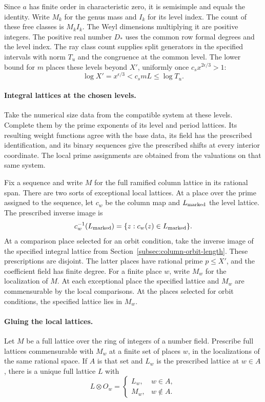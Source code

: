 Since \(a\) has finite order
in characteristic zero, it is semisimple and equals the identity. Write \(M_k\) for the genus
mass and \(I_k\) for its level index. The count of these free
classes is \(M_k I_k\). The Weyl dimensions multiplying
it are positive integers. The positive real number \(D_*\)
uses the common row formal degrees and the level index.
The ray class count supplies split generators in the specified
intervals with norm \(T_u\) and the congruence at the common
level. The lower bound for \(m\) places these levels beyond \(X'\), uniformly once \(c_s x^{2\epsilon/3}>1\):
\[
 \log X'=x^{\epsilon/3}<c_s mL\le\log T_u.
\]
\paragraph{Integral lattices at the chosen levels.}
Take the numerical size data from the compatible system at
these levels. Complete them by the prime exponents
of its level and period lattices. Its resulting weight
functions agree with the base data, its field has the
prescribed identification, and its binary sequences give
the prescribed shifts at every interior coordinate.
The local prime assignments are obtained from the valuations
on that same system.

Fix a sequence and write \(M\) for the full ramified column
lattice in its rational span. There are two sorts of exceptional
local lattices. At a place over the prime assigned to the sequence, let \(c_w\) be the column map and \(L_{\rm marked}\) the level lattice. The prescribed inverse image is
\[
 c_w^{-1}(L_{\rm marked})=\{z:c_w(z)\in L_{\rm marked}\}.
\] At a
comparison place selected for an orbit condition, take the
inverse image of the specified integral lattice from
Section~\ref{subsec:column-orbit-length}. These prescriptions
are disjoint. The latter places have rational prime
\(p\le X'\), and the coefficient field has finite degree.
For a finite place \(w\), write \(M_w\) for the localization
of \(M\). At each exceptional place the specified lattice
and \(M_w\) are commensurable by the local comparisons.
At the places selected for orbit conditions, the specified lattice lies in \(M_w\).
\paragraph{Gluing the local lattices.}
\begin{lemma}\label{lem:word-lattice-gluing}
Let \(M\) be a full lattice over the ring of integers of a number
field. Prescribe full lattices commensurable with \(M_w\) at a finite
set of places \(w\), in the localizations of the same rational
space. If \(A\) is that set and \(L_w\) is the prescribed lattice at \(w\in A\), there is a unique full lattice \(L\) with
\[
 L\otimes O_w=\begin{cases}L_w,&w\in A,\\ M_w,&w\notin A.\end{cases}
\]
\end{lemma}

